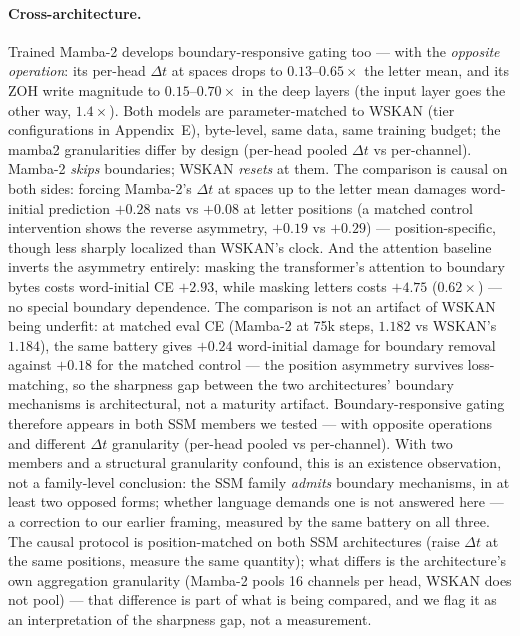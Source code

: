 \documentclass[11pt]{article}
\newcommand{\wskan}{WSKAN}
\newcommand{\Dt}{\Delta t}
\begin{document}
\paragraph{Cross-architecture.}
Trained Mamba-2 develops boundary-responsive gating too --- with the
\emph{opposite operation}: its per-head $\Dt$ at spaces drops to
$0.13$--$0.65\times$ the letter mean, and its ZOH write magnitude to
$0.15$--$0.70\times$ in the deep layers (the input layer goes the other
way, $1.4\times$). Both models are
parameter-matched to \wskan{} (tier configurations in Appendix~E), byte-level, same data, same
training budget; the mamba2 granularities differ by design (per-head
pooled $\Dt$ vs per-channel). Mamba-2 \emph{skips}
boundaries; \wskan{} \emph{resets} at them. The comparison is causal on
both sides: forcing Mamba-2's $\Dt$ at spaces up to the letter mean damages
word-initial prediction $+0.28$ nats vs $+0.08$ at letter positions (a
matched control intervention shows the reverse asymmetry, $+0.19$ vs
$+0.29$) --- position-specific, though less sharply localized than
\wskan{}'s clock. And the
attention baseline inverts the asymmetry entirely: masking the transformer's
attention to boundary bytes costs word-initial CE $+2.93$, while masking
letters costs $+4.75$ ($0.62\times$) --- no special boundary dependence.
The comparison is not an artifact of
\wskan{} being underfit: at matched eval CE (Mamba-2 at 75k steps,
$1.182$ vs \wskan{}'s $1.184$), the same battery gives $+0.24$
word-initial damage for boundary removal against $+0.18$ for the matched
control --- the position asymmetry survives loss-matching, so the
sharpness gap between the two architectures' boundary mechanisms is
architectural, not a maturity artifact.
Boundary-responsive gating therefore appears in both SSM members we
tested --- with opposite operations and different $\Dt$ granularity
(per-head pooled vs per-channel). With two members and a structural
granularity confound, this is an existence observation, not a family-level
conclusion: the SSM family \emph{admits} boundary mechanisms, in at least
two opposed forms; whether language demands one is not answered here ---
a correction to our earlier framing, measured by the same battery on all
three. The causal protocol
is position-matched on both SSM architectures (raise $\Dt$ at the same
positions, measure the same quantity); what differs is the architecture's
own aggregation granularity (Mamba-2 pools 16 channels per head, \wskan{}
does not pool) --- that difference is part of what is being compared, and
we flag it as an interpretation of the sharpness gap, not a measurement.
\end{document}
